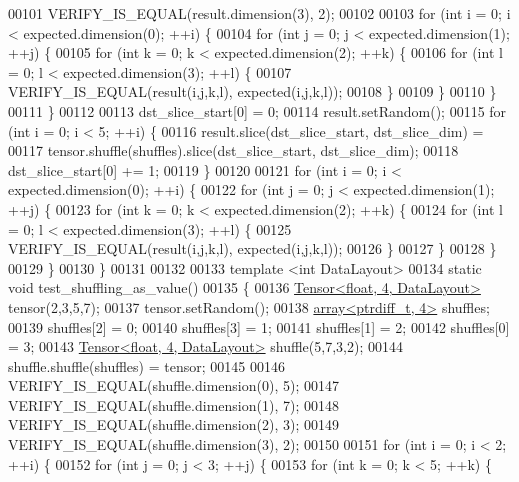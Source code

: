 \begin{DoxyCode}
00101   VERIFY\_IS\_EQUAL(result.dimension(3), 2);
00102 
00103   \textcolor{keywordflow}{for} (\textcolor{keywordtype}{int} i = 0; i < expected.dimension(0); ++i) \{
00104     \textcolor{keywordflow}{for} (\textcolor{keywordtype}{int} j = 0; j < expected.dimension(1); ++j) \{
00105       \textcolor{keywordflow}{for} (\textcolor{keywordtype}{int} k = 0; k < expected.dimension(2); ++k) \{
00106         \textcolor{keywordflow}{for} (\textcolor{keywordtype}{int} l = 0; l < expected.dimension(3); ++l) \{
00107           VERIFY\_IS\_EQUAL(result(i,j,k,l), expected(i,j,k,l));
00108         \}
00109       \}
00110     \}
00111   \}
00112 
00113   dst\_slice\_start[0] = 0;
00114   result.setRandom();
00115   \textcolor{keywordflow}{for} (\textcolor{keywordtype}{int} i = 0; i < 5; ++i) \{
00116     result.slice(dst\_slice\_start, dst\_slice\_dim) =
00117         tensor.shuffle(shuffles).slice(dst\_slice\_start, dst\_slice\_dim);
00118     dst\_slice\_start[0] += 1;
00119   \}
00120 
00121   \textcolor{keywordflow}{for} (\textcolor{keywordtype}{int} i = 0; i < expected.dimension(0); ++i) \{
00122     \textcolor{keywordflow}{for} (\textcolor{keywordtype}{int} j = 0; j < expected.dimension(1); ++j) \{
00123       \textcolor{keywordflow}{for} (\textcolor{keywordtype}{int} k = 0; k < expected.dimension(2); ++k) \{
00124         \textcolor{keywordflow}{for} (\textcolor{keywordtype}{int} l = 0; l < expected.dimension(3); ++l) \{
00125           VERIFY\_IS\_EQUAL(result(i,j,k,l), expected(i,j,k,l));
00126         \}
00127       \}
00128     \}
00129   \}
00130 \}
00131 
00132 
00133 \textcolor{keyword}{template} <\textcolor{keywordtype}{int} DataLayout>
00134 \textcolor{keyword}{static} \textcolor{keywordtype}{void} test\_shuffling\_as\_value()
00135 \{
00136   \hyperlink{class_eigen_1_1_tensor}{Tensor<float, 4, DataLayout>} tensor(2,3,5,7);
00137   tensor.setRandom();
00138   \hyperlink{class_eigen_1_1array}{array<ptrdiff\_t, 4>} shuffles;
00139   shuffles[2] = 0;
00140   shuffles[3] = 1;
00141   shuffles[1] = 2;
00142   shuffles[0] = 3;
00143   \hyperlink{class_eigen_1_1_tensor}{Tensor<float, 4, DataLayout>} shuffle(5,7,3,2);
00144   shuffle.shuffle(shuffles) = tensor;
00145 
00146   VERIFY\_IS\_EQUAL(shuffle.dimension(0), 5);
00147   VERIFY\_IS\_EQUAL(shuffle.dimension(1), 7);
00148   VERIFY\_IS\_EQUAL(shuffle.dimension(2), 3);
00149   VERIFY\_IS\_EQUAL(shuffle.dimension(3), 2);
00150 
00151   \textcolor{keywordflow}{for} (\textcolor{keywordtype}{int} i = 0; i < 2; ++i) \{
00152     \textcolor{keywordflow}{for} (\textcolor{keywordtype}{int} j = 0; j < 3; ++j) \{
00153       \textcolor{keywordflow}{for} (\textcolor{keywordtype}{int} k = 0; k < 5; ++k) \{

\end{DoxyCode}
